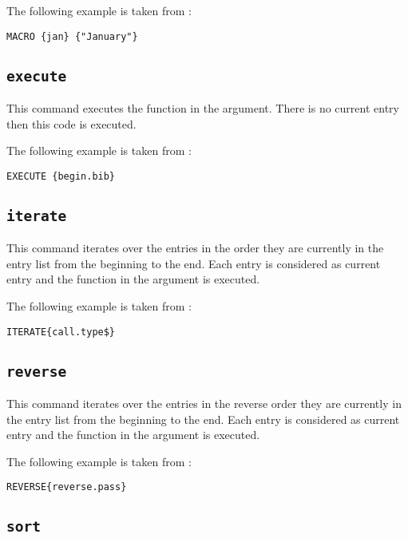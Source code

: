 The following example is taken from :

\begin{lstlisting}[language=bst]
  MACRO {jan} {"January"}
\end{lstlisting}


\subsection{\texttt{execute}}

This command executes the function in the argument. There is no
current entry then this code is executed.

The following example is taken from :

\begin{lstlisting}[language=bst]
  EXECUTE {begin.bib}
\end{lstlisting}


\subsection{\texttt{iterate}}

This command iterates over the entries in the order they are currently
in the entry list from the beginning to the end. Each entry is
considered as current entry and the function in the argument is
executed.

The following example is taken from :

\begin{lstlisting}[language=bst]
  ITERATE{call.type$}
\end{lstlisting}


\subsection{\texttt{reverse}}

This command iterates over the entries in the reverse order they are
currently in the entry list from the beginning to the end. Each entry
is considered as current entry and the function in the argument is
executed.

The following example is taken from :

\begin{lstlisting}[language=bst]
  REVERSE{reverse.pass}
\end{lstlisting}


\subsection{\texttt{sort}}

